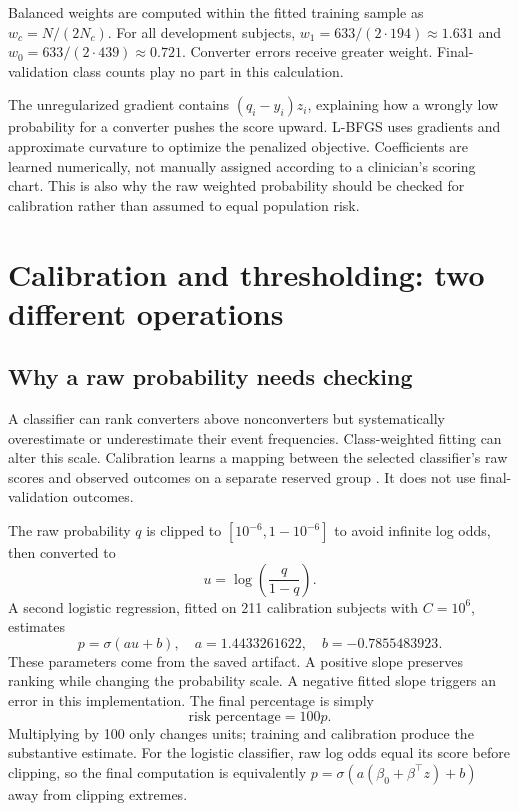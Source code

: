 Balanced weights are computed within the fitted training sample as $w_c=N/(2N_c)$. For all development subjects, $w_1=633/(2\cdot194)\approx1.631$ and $w_0=633/(2\cdot439)\approx0.721$. Converter errors receive greater weight. Final-validation class counts play no part in this calculation.

The unregularized gradient contains $(q_i-y_i)z_i$, explaining how a wrongly low probability for a converter pushes the score upward. L-BFGS uses gradients and approximate curvature to optimize the penalized objective. Coefficients are learned numerically, not manually assigned according to a clinician's scoring chart. This is also why the raw weighted probability should be checked for calibration rather than assumed to equal population risk.
\clearpage

\section{Calibration and thresholding: two different operations}
\subsection{Why a raw probability needs checking}
A classifier can rank converters above nonconverters but systematically overestimate or underestimate their event frequencies. Class-weighted fitting can alter this scale. Calibration learns a mapping between the selected classifier's raw scores and observed outcomes on a separate reserved group \cite{calibration}. It does not use final-validation outcomes.

The raw probability $q$ is clipped to $[10^{-6},1-10^{-6}]$ to avoid infinite log odds, then converted to
\begin{equation}u=\log\left(\frac{q}{1-q}\right).
\end{equation}
A second logistic regression, fitted on 211 calibration subjects with $C=10^6$, estimates
\begin{equation}p=\sigma(au+b),\quad a=1.4433261622,\quad b=-0.7855483923.
\end{equation}
These parameters come from the saved artifact. A positive slope preserves ranking while changing the probability scale. A negative fitted slope triggers an error in this implementation. The final percentage is simply
\begin{equation}\boxed{\text{risk percentage}=100p.}\end{equation}
Multiplying by 100 only changes units; training and calibration produce the substantive estimate. For the logistic classifier, raw log odds equal its score before clipping, so the final computation is equivalently $p=\sigma(a(\beta_0+\beta^\top z)+b)$ away from clipping extremes.

